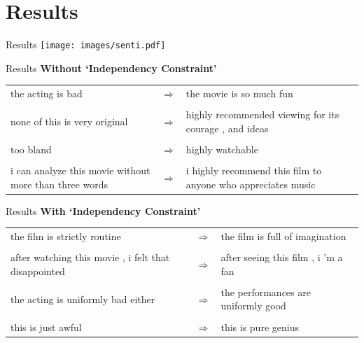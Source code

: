 \documentclass{beamer}
\begin{document}
\section{Results}
\begin{frame}{Results}
	\centering
	\texttt{[image: images/senti.pdf]}
\end{frame}

\begin{frame}{Results}
	\centering
	\textbf{Without `Independency Constraint'} \\
	\vspace{1cm}
	\small
	\begin{tabular}{ p{.4\linewidth} p{.05\linewidth} p{.4\linewidth} }
		the acting is bad                                      & $\Rightarrow$ & the movie is so much fun                                     \\ \\
		none of this is very original                          & $\Rightarrow$ & highly recommended viewing for its courage , and ideas       \\ \\
		too bland                                              & $\Rightarrow$ & highly watchable                                             \\ \\
		i can analyze this movie without more than three words & $\Rightarrow$ & i highly recommend this film to anyone who appreciates music
	\end{tabular}
\end{frame}

\begin{frame}{Results}
	\centering
	{\large \textbf{With `Independency Constraint'}} \\
	\vspace{1cm}
	\small
	\begin{tabular}{ p{.4\linewidth} p{.05\linewidth} p{.4\linewidth} }
		the film is strictly routine                         & $\Rightarrow$ & the film is full of imagination     \\  \\
		after watching this movie , i felt that disappointed & $\Rightarrow$ & after seeing this film , i 'm a fan \\  \\
		the acting is uniformly bad either                   & $\Rightarrow$ & the performances are uniformly good \\  \\
		this is just awful                                   & $\Rightarrow$ & this is pure genius
	\end{tabular}
\end{frame}
\end{document}
